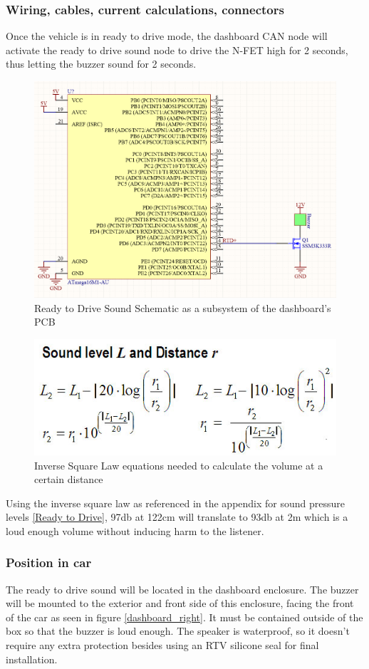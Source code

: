 \documentclass{article}
\begin{document}
\subsubsection{Wiring, cables, current calculations, connectors}
Once the vehicle is in ready to drive mode, the dashboard CAN node will activate the ready to drive sound node to drive the N-FET high for 2 seconds, thus letting the buzzer sound for 2 seconds. 


\begin{figure}[H]
	\includegraphics[width=\linewidth]{RTDS_Schematic_Simplified}
	\caption{Ready to Drive Sound Schematic as a subsystem of the dashboard's PCB}
\end{figure}
\begin{figure}[H]
\centering
	\includegraphics[width=0.6\linewidth]{FormulasForDistanceAndSoundLevel}
	\caption{Inverse Square Law equations needed to calculate the volume at a certain distance}
\end{figure}
Using the inverse square law as referenced in the appendix  for sound pressure levels \ref{Ready to Drive}, 97db at 122cm will translate to 93db at 2m which is a loud enough volume without inducing harm to the listener. 
\subsubsection{Position in car}
The ready to drive sound will be located in the dashboard enclosure. The buzzer will be mounted
to the exterior and front side of this enclosure, facing the front of the car as seen in figure \ref{dashboard_right}. It must be contained outside of the box so that the buzzer is
loud enough. The speaker is waterproof, so it doesn't require any extra protection besides using an RTV silicone seal for final installation. 
\end{document}
